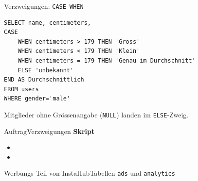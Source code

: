 \begin{frame}[fragile]{Verzweigungen: \lstinline|CASE WHEN|}
  \begin{lstlisting}
SELECT name, centimeters,
CASE
    WHEN centimeters > 179 THEN 'Gross'
    WHEN centimeters < 179 THEN 'Klein'
    WHEN centimeters = 179 THEN 'Genau im Durchschnitt'
    ELSE 'unbekannt'
END AS Durchschnittlich
FROM users
WHERE gender='male'
\end{lstlisting}
  Mitglieder ohne Grössenangabe (\lstinline|NULL|) landen im \lstinline|ELSE|-Zweig.
\end{frame}

\begin{frame}{Auftrag}{Verzweigungen}
  \textbf{Skript}
  \begin{itemize}
    \item {}
    \item {}
  \end{itemize}
\end{frame}

\begin{frame}{Werbungs-Teil von InstaHub}{Tabellen \texttt{ads} und \texttt{analytics}}
  \begin{figure}[H]
    \centering
  \end{figure}
\end{frame}

